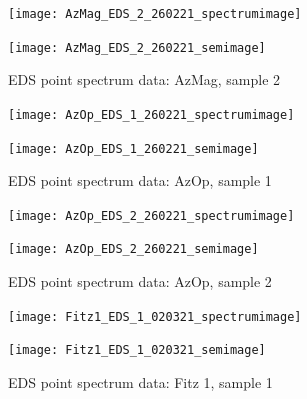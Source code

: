 \begin{figure}[H]
\centering
\begin{minipage}{.45\textwidth}
  \centering
  \texttt{[image: AzMag\_EDS\_2\_260221\_spectrumimage]}
\end{minipage}
\begin{minipage}{.45\textwidth}
  \centering
  \texttt{[image: AzMag\_EDS\_2\_260221\_semimage]}
\end{minipage}
\caption[EDS point spectrum data: AzMag, sample 2]{EDS point spectrum data: AzMag, sample 2}
\label{fig:azmag_point_eds_2}
\end{figure}


\begin{figure}[H]
\centering
\begin{minipage}{.45\textwidth}
  \centering
  \texttt{[image: AzOp\_EDS\_1\_260221\_spectrumimage]}
\end{minipage}
\begin{minipage}{.45\textwidth}
  \centering
  \texttt{[image: AzOp\_EDS\_1\_260221\_semimage]}
\end{minipage}
\caption[EDS point spectrum data: AzOp, sample 1]{EDS point spectrum data: AzOp, sample 1}
\label{fig:azop_point_eds_1}
\end{figure}

\begin{figure}[H]
\centering
\begin{minipage}{.45\textwidth}
  \centering
  \texttt{[image: AzOp\_EDS\_2\_260221\_spectrumimage]}
\end{minipage}
\begin{minipage}{.45\textwidth}
  \centering
  \texttt{[image: AzOp\_EDS\_2\_260221\_semimage]}
\end{minipage}
\caption[EDS point spectrum data: AzOp, sample 2]{EDS point spectrum data: AzOp, sample 2}
\label{fig:azop_point_eds_2}
\end{figure}



\begin{figure}[H]
\centering
\begin{minipage}{.45\textwidth}
  \centering
  \texttt{[image: Fitz1\_EDS\_1\_020321\_spectrumimage]}
\end{minipage}
\begin{minipage}{.45\textwidth}
  \centering
  \texttt{[image: Fitz1\_EDS\_1\_020321\_semimage]}
\end{minipage}
\caption[EDS point spectrum data: Fitz 1, sample 1]{EDS point spectrum data: Fitz 1, sample 1}
\label{fig:fitz1_point_eds_1}
\end{figure}


